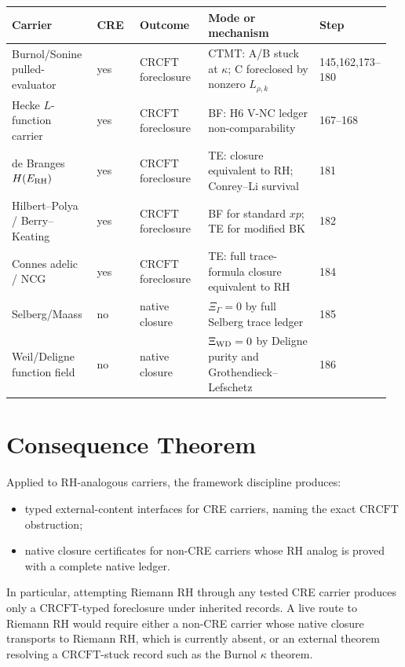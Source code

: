 \documentclass[11pt]{article}
\newcommand{\CRCFT}{\mathrm{CRCFT}}
\newcommand{\CTMT}{\mathrm{CTMT}}
\begin{document}
\begin{center}
\begin{tabular}{p{0.23\linewidth}p{0.12\linewidth}p{0.19\linewidth}p{0.34\linewidth}p{0.08\linewidth}}
\toprule
Carrier & CRE & Outcome & Mode or mechanism & Step\\
\midrule
Burnol/Sonine pulled-evaluator & yes & \(\CRCFT\) foreclosure
& \(\CTMT\): A/B stuck at \(\kappa\); C foreclosed by nonzero \(L_{\rho,k}\)
& 145,162,173--180\\
Hecke \(L\)-function carrier & yes & \(\CRCFT\) foreclosure
& BF: H6 V-NC ledger non-comparability
& 167--168\\
de Branges \(H(E_{\rm RH})\) & yes & \(\CRCFT\) foreclosure
& TE: closure equivalent to RH; Conrey--Li survival
& 181\\
Hilbert--Polya / Berry--Keating & yes & \(\CRCFT\) foreclosure
& BF for standard \(xp\); TE for modified BK
& 182\\
Connes adelic / NCG & yes & \(\CRCFT\) foreclosure
& TE: full trace-formula closure equivalent to RH
& 184\\
Selberg/Maass & no & native closure
& \(\Xi_\Gamma=0\) by full Selberg trace ledger
& 185\\
Weil/Deligne function field & no & native closure
& \(\Xi_{\rm WD}=0\) by Deligne purity and Grothendieck--Lefschetz
& 186\\
\bottomrule
\end{tabular}
\end{center}

\section*{Consequence Theorem}

Applied to RH-analogous carriers, the framework discipline produces:
\begin{itemize}
\item typed external-content interfaces for CRE carriers, naming the exact
\(\CRCFT\) obstruction;
\item native closure certificates for non-CRE carriers whose RH analog is
proved with a complete native ledger.
\end{itemize}

In particular, attempting Riemann RH through any tested CRE carrier produces
only a \(\CRCFT\)-typed foreclosure under inherited records.  A live route to
Riemann RH would require either a non-CRE carrier whose native closure
transports to Riemann RH, which is currently absent, or an external theorem
resolving a \(\CRCFT\)-stuck record such as the Burnol \(\kappa\) theorem.
\end{document}
